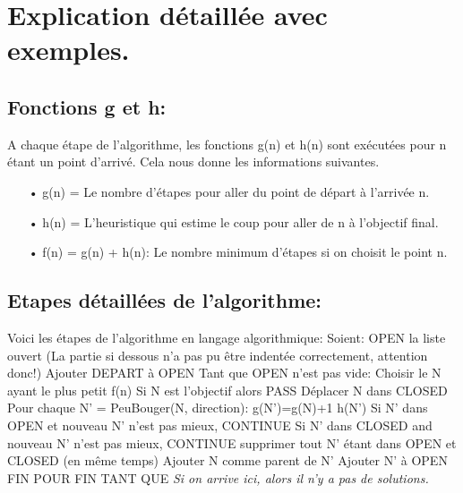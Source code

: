 \documentclass{article}
\begin{document}
\section{Explication détaillée avec exemples.}
\subsection{Fonctions g et h:}
A chaque étape de l'algorithme, les fonctions g(n) et h(n) sont exécutées pour n étant un point d'arrivé. Cela nous donne les informations suivantes.
\begin{itemize}
\item[• g(n) = Le nombre d'étapes pour aller du point de départ à l'arrivée n.]
\item[• h(n) = L'heuristique qui estime le coup pour aller de n à l'objectif final.]
\item[• f(n) = g(n) + h(n): Le nombre minimum d'étapes si on choisit le point n.]
\end{itemize}
\subsection{Etapes détaillées de l'algorithme:}
Voici les étapes de l'algorithme en langage algorithmique: \newline
Soient: OPEN la liste ouvert \newline
(La partie si dessous n'a pas pu être indentée correctement, attention donc!)
Ajouter DEPART à OPEN \newline
Tant que OPEN n'est pas vide:\newline
	Choisir le N ayant le plus petit f(n)\newline
	Si N est l'objectif alors PASS\newline
	Déplacer N dans CLOSED\newline
	Pour chaque N' = PeuBouger(N, direction):\newline
		g(N')=g(N)+1\newline
		h(N')\newline
		Si N' dans OPEN et nouveau N' n'est pas mieux, CONTINUE\newline
		Si N' dans CLOSED and nouveau N' n'est pas mieux, CONTINUE\newline
		supprimer tout N' étant dans OPEN et CLOSED (en même temps)\newline
		Ajouter N comme parent de N'\newline
		Ajouter N' à OPEN\newline
	FIN POUR\newline
FIN TANT QUE\newline
\textit{Si on arrive ici, alors il n'y a pas de solutions.}
			
\end{document}
